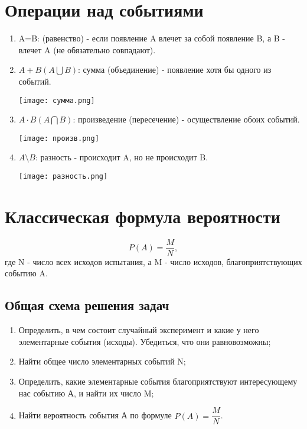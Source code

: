 \documentclass[../Main.tex]{subfiles}
\begin{document}


\section{Операции над событиями}
\begin{enumerate}
    \item A=B: (равенство) - если появление A влечет за собой появление B, а B - влечет A (не обязательно совпадают).
    \item \(A+B (A \bigcup B)\): сумма (объединение) - появление хотя бы одного из событий.
    \begin{center}
        \texttt{[image: сумма.png]}
    \end{center}
    \item \(A \cdot B (A \bigcap B)\): произведение (пересечение) - осуществление обоих событий.
    \begin{center}
        \texttt{[image: произв.png]}
    \end{center}
    \item \(A \setminus B\): разность - происходит A, но не происходит B.
    \begin{center}
        \texttt{[image: разность.png]}
    \end{center}
\end{enumerate}

\section{Классическая формула вероятности}


\[P(A) = \dfrac{M}{N},\]
где N - число всех исходов испытания, а M - число исходов, благоприятствующих событию A.

\subsection*{Общая схема решения задач}
\begin{enumerate}
    \item Определить, в чем состоит случайный эксперимент и какие у него элементарные события (исходы). Убедиться, что они равновозможны;
    \item Найти общее число элементарных событий N;
    \item Определить, какие элементарные события благоприятствуют интересующему нас событию А, и найти их число M;
    \item Найти вероятность события А по формуле \(P(A) = \dfrac{M}{N}\).
\end{enumerate}
\end{document}
